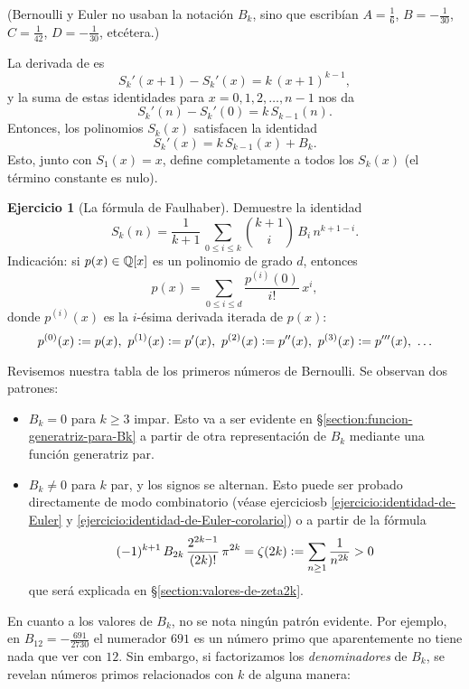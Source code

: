 \documentclass{article}
\numberwithin{equation}{section}
\theoremstyle{definition}
\newtheorem{ejercicio}{Ejercicio}
\begin{document}
\noindent (Bernoulli y Euler no usaban la notación $B_k$, sino que escribían
$A = \frac{1}{6}$, $B = -\frac{1}{30}$, $C = \frac{1}{42}$, $D = -\frac{1}{30}$,
etcétera.)

La derivada de  es
$$S_k' (x+1) - S_k' (x) = k\,(x+1)^{k-1},$$
y la suma de estas identidades para $x = 0,1,2,\ldots,n-1$ nos da
$$S_k' (n) - S_k' (0) = k\,S_{k-1} (n).$$
Entonces, los polinomios $S_k (x)$ satisfacen la identidad
$$S_k' (x) = k\,S_{k-1} (x) + B_k.$$
Esto, junto con $S_1 (x) = x$, define completamente a todos los $S_k (x)$
(el término constante es nulo).

\begin{ejercicio}[La fórmula de Faulhaber]
  \label{ejercicio:suma-de-potencias-y-Bk}
  Demuestre la identidad
  $$S_k (n) = \frac{1}{k+1}\,\sum_{0 \le i \le k} {k+1\choose i}\,B_i\,n^{k+1-i}.$$
  \noindent Indicación: si $p (x) \in \mathbb{Q} [x]$ es un polinomio de grado $d$,
  entonces
  $$p (x) = \sum_{0 \le i \le d} \frac{p^{(i)} (0)}{i!}\,x^i,$$
  donde $p^{(i)} (x)$ es la $i$-ésima derivada iterada de $p (x)$:
  $$p^{(0)} (x) \mathrel{\mathop:}= p (x), ~
  p^{(1)} (x) \mathrel{\mathop:}= p' (x), ~
  p^{(2)} (x) \mathrel{\mathop:}= p'' (x), ~
  p^{(3)} (x) \mathrel{\mathop:}= p''' (x), ~
  \ldots$$
\end{ejercicio}

Revisemos nuestra tabla de los primeros números de Bernoulli. Se observan dos patrones:

\begin{itemize}
\item $B_k = 0$ para $k \ge 3$ impar. Esto va a ser evidente en
  \S\ref{section:funcion-generatriz-para-Bk} a partir de otra representación de
  $B_k$ mediante una función generatriz par.

\item $B_k \ne 0$ para $k$ par, y los signos se alternan. Esto puede ser probado
  directamente de modo combinatorio (véase ejerciciosb
  \ref{ejercicio:identidad-de-Euler} y
  \ref{ejercicio:identidad-de-Euler-corolario}) o a partir de la fórmula
  $$(-1)^{k+1} \, B_{2k}\,\frac{2^{2k-1}}{(2k)!}\,\pi^{2k} =
  \zeta (2k) \mathrel{\mathop:}= \sum_{n \ge 1} \frac{1}{n^{2k}} > 0$$
  que será explicada en \S\ref{section:valores-de-zeta2k}.
\end{itemize}

En cuanto a los valores de $B_k$, no se nota ningún patrón evidente.
Por ejemplo, en $B_{12} = -\frac{691}{2730}$ el numerador $691$ es un número
primo que aparentemente no tiene nada que ver con $12$. Sin embargo, si
factorizamos los \emph{denominadores} de $B_k$, se revelan números primos
relacionados con $k$ de alguna manera:
\end{document}
